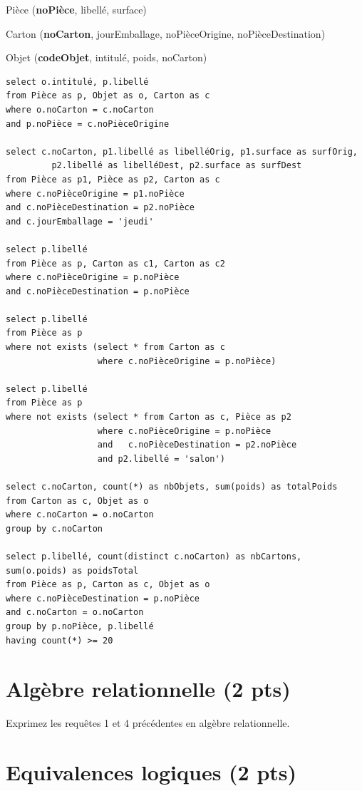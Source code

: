 \begin{solution}
Pièce (\textbf{noPièce}, libellé, surface)

Carton (\textbf{noCarton}, jourEmballage, noPièceOrigine, 
                            noPièceDestination)

Objet (\textbf{codeObjet}, intitulé, poids,
                     noCarton)

\begin{verbatim}
select o.intitulé, p.libellé
from Pièce as p, Objet as o, Carton as c
where o.noCarton = c.noCarton
and p.noPièce = c.noPièceOrigine

select c.noCarton, p1.libellé as libelléOrig, p1.surface as surfOrig, 
         p2.libellé as libelléDest, p2.surface as surfDest
from Pièce as p1, Pièce as p2, Carton as c
where c.noPièceOrigine = p1.noPièce
and c.noPièceDestination = p2.noPièce
and c.jourEmballage = 'jeudi'

select p.libellé 
from Pièce as p, Carton as c1, Carton as c2
where c.noPièceOrigine = p.noPièce
and c.noPièceDestination = p.noPièce

select p.libellé 
from Pièce as p
where not exists (select * from Carton as c
                  where c.noPièceOrigine = p.noPièce)

select p.libellé 
from Pièce as p
where not exists (select * from Carton as c, Pièce as p2
                  where c.noPièceOrigine = p.noPièce
                  and   c.noPièceDestination = p2.noPièce
                  and p2.libellé = 'salon')

select c.noCarton, count(*) as nbObjets, sum(poids) as totalPoids
from Carton as c, Objet as o
where c.noCarton = o.noCarton
group by c.noCarton

select p.libellé, count(distinct c.noCarton) as nbCartons, sum(o.poids) as poidsTotal
from Pièce as p, Carton as c, Objet as o
where c.noPièceDestination = p.noPièce 
and c.noCarton = o.noCarton
group by p.noPièce, p.libellé
having count(*) >= 20
\end{verbatim}
\end{solution}


\section{Algèbre relationnelle ({\bf 2 pts})}

Exprimez les requêtes 1 et 4 précédentes
en algèbre relationnelle.


\section{Equivalences logiques ({\bf 2 pts})}

